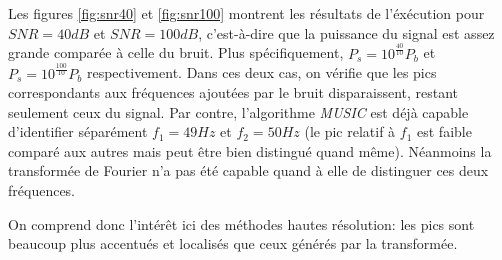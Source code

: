 \documentclass{article}
\begin{document}
\FloatBarrier

Les figures \ref{fig:snr40} et \ref{fig:snr100} montrent les résultats de l'éxécution pour \(SNR = 40dB\) et \(SNR = 100dB\), c'est-à-dire que la puissance du  signal est assez grande comparée à celle du bruit. Plus spécifiquement, \(P_s = 10^{\frac{40}{10}}P_b\) et \(P_s = 10^{\frac{100}{10}}P_b\) respectivement. Dans ces deux cas, on vérifie que les pics correspondants aux fréquences ajoutées par le bruit disparaissent, restant seulement ceux du signal. Par contre, l'algorithme \textit{MUSIC} est déjà capable d'identifier séparément \(f_1 = 49Hz\) et \(f_2=50Hz\) (le pic relatif à \(f_1\) est faible comparé aux autres mais  peut être bien distingué quand même). Néanmoins la transformée de Fourier n'a pas été capable quand à elle de distinguer ces deux fréquences.

\vspace*{10pt}

On comprend donc l'intérêt ici des méthodes hautes résolution: les pics sont beaucoup plus accentués et localisés que ceux générés par la transformée.


\FloatBarrier
\end{document}
